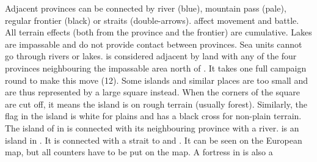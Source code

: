 \aparag[Frontiers] Adjacent provinces can be connected by river (blue),
mountain pass (pale), regular frontier (black) or straits (double-arrows).
 affect movement and battle. All
terrain effects (both from the province and the frontier) are cumulative.
\aparag[Lakes] Lakes are impassable and do not provide contact between
provinces.
\bparag Sea units cannot go through rivers or lakes.
\label{chBasics:Secret Passage:Bering}
\granderegionKamchatka is considered adjacent by land with any of the four
provinces neighbouring the impassable area north of \seazoneOkhotsk.
It takes one full campaign round to make this move (12\MP).
 Some islands and similar places are too small and are
thus represented by a large square instead.
\bparag When the corners of the square are cut off, it means the island is on
rough terrain (usually forest). Similarly, the flag in the island is white for
plains and has a black cross for non-plain terrain.
\bparag The island of  in \granderegionAcadie is
connected with its neighbouring province with a river.
\bparag\label{chBasics:Provinces:Ormus} \null\provinceOrmus is an
island in \seazonePersique. It is connected with a strait to \provinceBam and
. It can be seen on the European map, but all counters have
to be put on the \ROTW map. A fortress in \provinceOrmus is also a \Presidio
